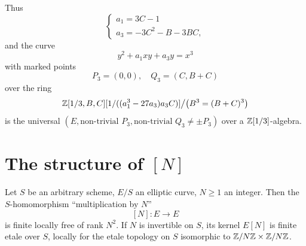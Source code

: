 \kmitem\label{item:2.2.11}
Thus
\[
\begin{cases}
a_1 = 3C - 1 \\
a_3 = -3C^2 - B - 3BC,
\end{cases}
\]
and the curve
\[
y^2 + a_1 xy + a_3 y = x^3
\]
with marked points
\[
P_3 = (0, 0), \quad Q_3 = (C, B + C)
\]
over the ring
\[
\mathbb{Z}[1/3, B, C][1/((a_1^3 - 27a_3) a_3 C)] \big/ \bigl(B^3 = (B + C)^3\bigr)
\]
is the universal $(E, \text{non-trivial } P_3, \text{non-trivial } Q_3 \ne \pm P_3)$ over a $\mathbb{Z}[1/3]$-algebra.

\section{The structure of $[N]$}
\label{sec:2.3}

\begin{theorem}\label{thm:2.3.1}
Let $S$ be an arbitrary scheme, $E/S$ an elliptic curve, $N \ge 1$ an integer. Then the $S$-homomorphism ``multiplication by $N$''
\[
[N] : E \longrightarrow E
\]
is finite locally free of rank $N^2$. If $N$ is invertible on $S$, its kernel $E[N]$ is finite etale over $S$, locally for the etale topology on $S$ isomorphic to $\mathbb{Z}/N\mathbb{Z} \times \mathbb{Z}/N\mathbb{Z}$.
\end{theorem}

